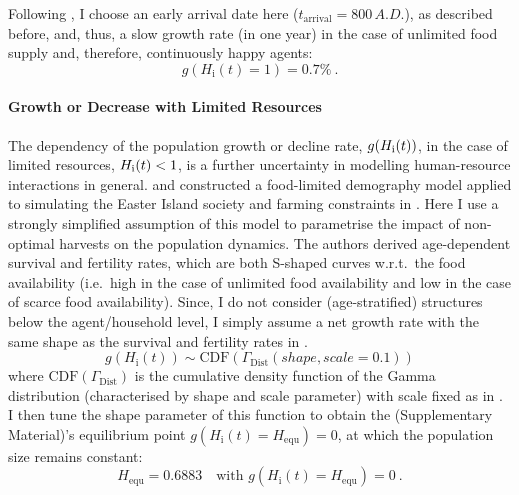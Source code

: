 Following \citet{Bahn2017}, I choose an early arrival date here ($t_\text{arrival}=800\, A.D.$), as described before, and, thus, a slow growth rate (in one year) in the case of unlimited food supply and, therefore, continuously happy agents: 
\begin{equation}
	g(H_\text{i}(t)=1) = 0.7\% \ .
\end{equation}

\paragraph{Growth or Decrease with Limited Resources}
The dependency of the population growth or decline rate, $g(H_{\rm i}(t))$, in the case of limited resources, $H_{\rm i}(t)<1$, is a further uncertainty in modelling human-resource interactions in general.
\citet{Lee2008} and \citet{Puleston2008} constructed a food-limited demography model applied to simulating the Easter Island society and farming constraints in \citet{Puleston2017}. 
Here I use a strongly simplified assumption of this model to parametrise the impact of non-optimal harvests on the population dynamics. 
The authors derived age-dependent survival and fertility rates, which are both S-shaped curves w.r.t.\ the food availability (i.e.\ high in the case of unlimited food availability and low in the case of scarce food availability).
Since, I do not consider (age-stratified) structures below the agent/household level, I simply assume a net growth rate with the same shape as the survival and fertility rates in \citet{Lee2008}.
\begin{equation}
g(H_\text{i}(t)) \sim \text{CDF}(\Gamma_\text{Dist}(shape, scale=0.1))
\end{equation}
where $\text{CDF}(\Gamma_\text{Dist})$ is the cumulative density function of the Gamma distribution (characterised by shape and scale parameter) with scale fixed as in \citet{Lee2008}.
I then tune the shape parameter of this function to obtain the \citet{Puleston2017} (Supplementary Material)'s  equilibrium point $g(H_\text{i}(t) =H_\text{equ})=0$, at which the population size remains constant:
\begin{equation}
H_\text{equ}=0.6883 \quad \text{with } g(H_\text{i}(t) = H_\text{equ})=0   \ .
\end{equation} 
